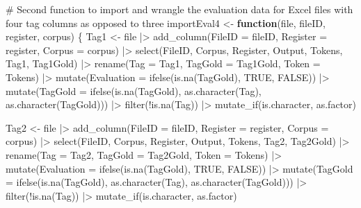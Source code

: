 \documentclass[
  letterpaper,
  DIV=11,
  numbers=noendperiod]{scrreprt}
\newenvironment{Shaded}{\begin{snugshade}}{\end{snugshade}}
\newcommand{\AttributeTok}[1]{\textcolor[rgb]{0.40,0.45,0.13}{#1}}
\newcommand{\CommentTok}[1]{\textcolor[rgb]{0.37,0.37,0.37}{#1}}
\newcommand{\ConstantTok}[1]{\textcolor[rgb]{0.56,0.35,0.01}{#1}}
\newcommand{\ControlFlowTok}[1]{\textcolor[rgb]{0.00,0.23,0.31}{\textbf{#1}}}
\newcommand{\FunctionTok}[1]{\textcolor[rgb]{0.28,0.35,0.67}{#1}}
\newcommand{\NormalTok}[1]{\textcolor[rgb]{0.00,0.23,0.31}{#1}}
\newcommand{\OtherTok}[1]{\textcolor[rgb]{0.00,0.23,0.31}{#1}}
\newcommand{\SpecialCharTok}[1]{\textcolor[rgb]{0.37,0.37,0.37}{#1}}
\begin{document}
\begin{Shaded}
\begin{Highlighting}[]
\CommentTok{\# Second function to import and wrangle the evaluation data for Excel files with four tag columns as opposed to three}
\NormalTok{importEval4 }\OtherTok{\textless{}{-}} \ControlFlowTok{function}\NormalTok{(file, fileID, register, corpus) \{}
\NormalTok{  Tag1 }\OtherTok{\textless{}{-}}\NormalTok{ file }\SpecialCharTok{|\textgreater{}} 
  \FunctionTok{add\_column}\NormalTok{(}\AttributeTok{FileID =}\NormalTok{ fileID, }\AttributeTok{Register =}\NormalTok{ register, }\AttributeTok{Corpus =}\NormalTok{ corpus) }\SpecialCharTok{|\textgreater{}}
  \FunctionTok{select}\NormalTok{(FileID, Corpus, Register, Output, Tokens, Tag1, Tag1Gold) }\SpecialCharTok{|\textgreater{}} 
  \FunctionTok{rename}\NormalTok{(}\AttributeTok{Tag =}\NormalTok{ Tag1, }\AttributeTok{TagGold =}\NormalTok{ Tag1Gold, }\AttributeTok{Token =}\NormalTok{ Tokens) }\SpecialCharTok{|\textgreater{}} 
  \FunctionTok{mutate}\NormalTok{(}\AttributeTok{Evaluation =} \FunctionTok{ifelse}\NormalTok{(}\FunctionTok{is.na}\NormalTok{(TagGold), }\ConstantTok{TRUE}\NormalTok{, }\ConstantTok{FALSE}\NormalTok{)) }\SpecialCharTok{|\textgreater{}} 
  \FunctionTok{mutate}\NormalTok{(}\AttributeTok{TagGold =} \FunctionTok{ifelse}\NormalTok{(}\FunctionTok{is.na}\NormalTok{(TagGold), }\FunctionTok{as.character}\NormalTok{(Tag), }\FunctionTok{as.character}\NormalTok{(TagGold))) }\SpecialCharTok{|\textgreater{}}
  \FunctionTok{filter}\NormalTok{(}\SpecialCharTok{!}\FunctionTok{is.na}\NormalTok{(Tag)) }\SpecialCharTok{|\textgreater{}} 
  \FunctionTok{mutate\_if}\NormalTok{(is.character, as.factor)}
  
\NormalTok{  Tag2 }\OtherTok{\textless{}{-}}\NormalTok{ file }\SpecialCharTok{|\textgreater{}} 
  \FunctionTok{add\_column}\NormalTok{(}\AttributeTok{FileID =}\NormalTok{ fileID, }\AttributeTok{Register =}\NormalTok{ register, }\AttributeTok{Corpus =}\NormalTok{ corpus) }\SpecialCharTok{|\textgreater{}}
  \FunctionTok{select}\NormalTok{(FileID, Corpus, Register, Output, Tokens, Tag2, Tag2Gold) }\SpecialCharTok{|\textgreater{}} 
  \FunctionTok{rename}\NormalTok{(}\AttributeTok{Tag =}\NormalTok{ Tag2, }\AttributeTok{TagGold =}\NormalTok{ Tag2Gold, }\AttributeTok{Token =}\NormalTok{ Tokens) }\SpecialCharTok{|\textgreater{}} 
  \FunctionTok{mutate}\NormalTok{(}\AttributeTok{Evaluation =} \FunctionTok{ifelse}\NormalTok{(}\FunctionTok{is.na}\NormalTok{(TagGold), }\ConstantTok{TRUE}\NormalTok{, }\ConstantTok{FALSE}\NormalTok{)) }\SpecialCharTok{|\textgreater{}} 
  \FunctionTok{mutate}\NormalTok{(}\AttributeTok{TagGold =} \FunctionTok{ifelse}\NormalTok{(}\FunctionTok{is.na}\NormalTok{(TagGold), }\FunctionTok{as.character}\NormalTok{(Tag), }\FunctionTok{as.character}\NormalTok{(TagGold))) }\SpecialCharTok{|\textgreater{}}
  \FunctionTok{filter}\NormalTok{(}\SpecialCharTok{!}\FunctionTok{is.na}\NormalTok{(Tag)) }\SpecialCharTok{|\textgreater{}} 
  \FunctionTok{mutate\_if}\NormalTok{(is.character, as.factor)}


\end{Highlighting}
\end{Shaded}
\end{document}
